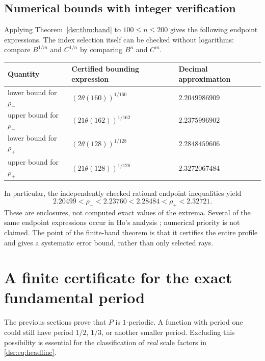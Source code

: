 \documentclass[11pt,a4paper]{article}
\numberwithin{equation}{section}
\theoremstyle{definition}
\theoremstyle{remark}
\theoremstyle{definition}
\theoremstyle{plain}
\begin{document}
\subsection{Numerical bounds with integer verification}
Applying Theorem~\ref{dsr:thm:band} to $100\le n\le200$ gives the following endpoint
expressions. The index selection itself can be checked without logarithms:
compare $B^{1/m}$ and $C^{1/n}$ by comparing $B^n$ and $C^m$.
\begin{center}
\begin{tabular}{@{}lll@{}}
\toprule
Quantity & Certified bounding expression & Decimal approximation\\
\midrule
lower bound for $\rho_-$ & $(2\theta(160))^{1/160}$ & $2.2049986909$\\
upper bound for $\rho_-$ & $(21\theta(162))^{1/162}$ & $2.2375996902$\\
lower bound for $\rho_+$ & $(2\theta(128))^{1/128}$ & $2.2848459606$\\
upper bound for $\rho_+$ & $(21\theta(128))^{1/128}$ & $2.3272067484$\\
\bottomrule
\end{tabular}
\end{center}
In particular, the independently checked rational endpoint inequalities yield
\begin{equation}
 2.20499<\rho_-<2.23760<2.28484<\rho_+<2.32721.
\label{dsr:eq:numeric-bounds}
\end{equation}
These are enclosures, not computed exact values of the extrema. Several of the
same endpoint expressions occur in Ho's analysis \cite{Ho}; numerical
priority is not claimed. The point of the finite-band theorem is that it
certifies the entire profile and gives a systematic error bound, rather than
only selected rays.

\section{A finite certificate for the exact fundamental period}
\label{dsr:sec:period}
The previous sections prove that $P$ is $1$-periodic. A function with period
one could still have period $1/2$, $1/3$, or another smaller period. Excluding
this possibility is essential for the classification of \emph{real} scale
factors in \eqref{dsr:eq:headline}.
\end{document}
